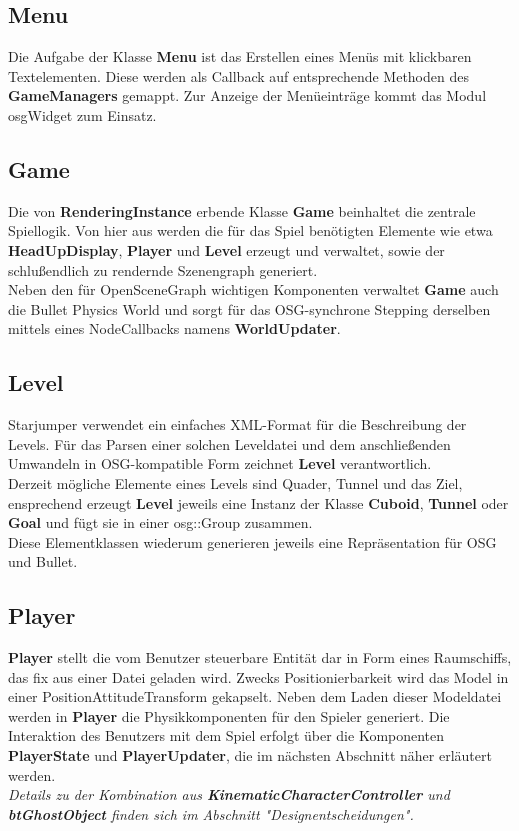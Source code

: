 \documentclass{llncs}
\begin{document}
\subsection{Menu}
Die Aufgabe der Klasse \textbf{Menu} ist das Erstellen eines Men\"us mit klickbaren Textelementen. Diese
werden als Callback auf entsprechende Methoden des \textbf{GameManagers} gemappt. Zur Anzeige der Men\"ueintr\"age
kommt das Modul osgWidget zum Einsatz.

\subsection{Game}
Die von \textbf{RenderingInstance} erbende Klasse \textbf{Game} beinhaltet die zentrale Spiellogik. Von hier aus werden die
f\"ur das Spiel ben\"otigten Elemente wie etwa \textbf{HeadUpDisplay}, \textbf{Player} und \textbf{Level} erzeugt und verwaltet,
sowie der schlu\ss endlich zu rendernde Szenengraph generiert.\\
Neben den f\"ur OpenSceneGraph wichtigen Komponenten verwaltet \textbf{Game} auch die Bullet Physics World und sorgt
f\"ur das OSG-synchrone Stepping derselben mittels eines NodeCallbacks namens \textbf{WorldUpdater}.

\subsection{Level}
Starjumper verwendet ein einfaches XML-Format f\"ur die Beschreibung der Levels. F\"ur das Parsen einer
solchen Leveldatei und dem anschlie\ss enden Umwandeln in OSG-kompatible Form zeichnet \textbf{Level} verantwortlich.\\
Derzeit m\"ogliche Elemente eines Levels sind Quader, Tunnel und das Ziel, ensprechend erzeugt \textbf{Level}
jeweils eine Instanz der Klasse \textbf{Cuboid}, \textbf{Tunnel} oder \textbf{Goal} und f\"ugt sie in einer osg::Group zusammen.\\
Diese Elementklassen wiederum generieren jeweils eine Repr\"asentation f\"ur OSG und Bullet.

\subsection{Player}
\textbf{Player} stellt die vom Benutzer steuerbare Entit\"at dar in Form eines Raumschiffs, das fix aus einer Datei
geladen wird. Zwecks Positionierbarkeit wird das Model in einer PositionAttitudeTransform gekapselt.
Neben dem Laden dieser Modeldatei werden in \textbf{Player} die Physikkomponenten f\"ur den Spieler generiert.
Die Interaktion des Benutzers mit dem Spiel erfolgt \"uber die Komponenten \textbf{PlayerState} und \textbf{PlayerUpdater},
die im n\"achsten Abschnitt n\"aher erl\"autert werden.\\
\textit{Details zu der Kombination aus \textbf{KinematicCharacterController} und \textbf{btGhostObject} finden sich im Abschnitt "Designentscheidungen".}
\end{document}
